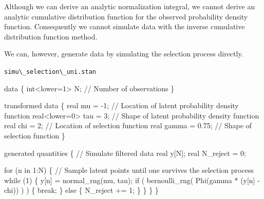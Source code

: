 \documentclass[
  letterpaper,
  DIV=11,
  numbers=noendperiod]{scrartcl}
\newenvironment{Shaded}{\begin{snugshade}}{\end{snugshade}}
\newcommand{\CommentTok}[1]{\textcolor[rgb]{0.37,0.37,0.37}{#1}}
\newcommand{\ControlFlowTok}[1]{\textcolor[rgb]{0.00,0.23,0.31}{#1}}
\newcommand{\DataTypeTok}[1]{\textcolor[rgb]{0.68,0.00,0.00}{#1}}
\newcommand{\DecValTok}[1]{\textcolor[rgb]{0.68,0.00,0.00}{#1}}
\newcommand{\FloatTok}[1]{\textcolor[rgb]{0.68,0.00,0.00}{#1}}
\newcommand{\KeywordTok}[1]{\textcolor[rgb]{0.00,0.23,0.31}{#1}}
\newcommand{\NormalTok}[1]{\textcolor[rgb]{0.00,0.23,0.31}{#1}}
\begin{document}
Although we can derive an analytic normalization integral, we cannot
derive an analytic cumulative distribution function for the observed
probability density function. Consequently we cannot simulate data with
the inverse cumulative distribution function method.

We can, however, generate data by simulating the selection process
directly.

\begin{codelisting}

\caption{\texttt{simu\textbackslash\_selection\textbackslash\_uni.stan}}

\begin{Shaded}
\begin{Highlighting}[]
\KeywordTok{data}\NormalTok{ \{}
  \DataTypeTok{int}\NormalTok{\textless{}}\KeywordTok{lower}\NormalTok{=}\DecValTok{1}\NormalTok{\textgreater{} N; }\CommentTok{// Number of observations}
\NormalTok{\}}

\KeywordTok{transformed data}\NormalTok{ \{}
  \DataTypeTok{real}\NormalTok{ mu = {-}}\DecValTok{1}\NormalTok{;          }\CommentTok{// Location of latent probability density function}
  \DataTypeTok{real}\NormalTok{\textless{}}\KeywordTok{lower}\NormalTok{=}\DecValTok{0}\NormalTok{\textgreater{} tau = }\DecValTok{3}\NormalTok{; }\CommentTok{// Shape of latent probability density function}
  \DataTypeTok{real}\NormalTok{ chi = }\DecValTok{2}\NormalTok{;          }\CommentTok{// Location of selection function}
  \DataTypeTok{real}\NormalTok{ gamma = }\FloatTok{0.75}\NormalTok{;     }\CommentTok{// Shape of selection function}
\NormalTok{\}}

\KeywordTok{generated quantities}\NormalTok{ \{}
  \CommentTok{// Simulate filtered data}
  \DataTypeTok{real}\NormalTok{ y[N];}
  \DataTypeTok{real}\NormalTok{ N\_reject = }\DecValTok{0}\NormalTok{;}
  
  \ControlFlowTok{for}\NormalTok{ (n }\ControlFlowTok{in} \DecValTok{1}\NormalTok{:N) \{}
    \CommentTok{// Sample latent points until one survives the selection process}
    \ControlFlowTok{while}\NormalTok{ (}\DecValTok{1}\NormalTok{) \{}
\NormalTok{      y[n] = normal\_rng(mu, tau);}
      \ControlFlowTok{if}\NormalTok{ ( bernoulli\_rng( Phi(gamma * (y[n] {-} chi)) ) ) \{}
        \ControlFlowTok{break}\NormalTok{;}
\NormalTok{      \} }\ControlFlowTok{else}\NormalTok{ \{}
\NormalTok{        N\_reject += }\DecValTok{1}\NormalTok{;}
\NormalTok{      \}}
\NormalTok{    \}}
\NormalTok{  \}}
\NormalTok{\}}
\end{Highlighting}
\end{Shaded}

\end{codelisting}
\end{document}
